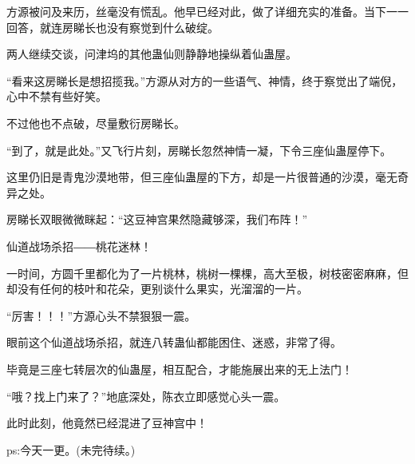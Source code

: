 \begin{this_body}
方源被问及来历，丝毫没有慌乱。他早已经对此，做了详细充实的准备。当下一一回答，就连房睇长也没有察觉到什么破绽。

两人继续交谈，问津坞的其他蛊仙则静静地操纵着仙蛊屋。

“看来这房睇长是想招揽我。”方源从对方的一些语气、神情，终于察觉出了端倪，心中不禁有些好笑。

不过他也不点破，尽量敷衍房睇长。

“到了，就是此处。”又飞行片刻，房睇长忽然神情一凝，下令三座仙蛊屋停下。

这里仍旧是青鬼沙漠地带，但三座仙蛊屋的下方，却是一片很普通的沙漠，毫无奇异之处。

房睇长双眼微微眯起：“这豆神宫果然隐藏够深，我们布阵！”

仙道战场杀招――桃花迷林！

一时间，方圆千里都化为了一片桃林，桃树一棵棵，高大至极，树枝密密麻麻，但却没有任何的枝叶和花朵，更别谈什么果实，光溜溜的一片。

“厉害！！！”方源心头不禁狠狠一震。

眼前这个仙道战场杀招，就连八转蛊仙都能困住、迷惑，非常了得。

毕竟是三座七转层次的仙蛊屋，相互配合，才能施展出来的无上法门！

“哦？找上门来了？”地底深处，陈衣立即感觉心头一震。

此时此刻，他竟然已经混进了豆神宫中！

ps:今天一更。(未完待续。)

\end{this_body}

